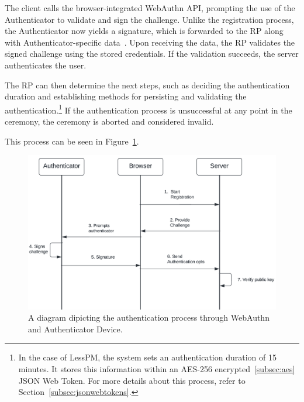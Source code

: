The client calls the browser-integrated WebAuthn API, prompting the use of the
Authenticator to validate and sign the challenge.
Unlike the registration process, the Authenticator now yields a signature, which is forwarded to the RP along with
Authenticator-specific data~\cite{webauthn_authenticator_data}.
Upon receiving the data, the RP validates the signed challenge using the stored credentials.
If the validation succeeds, the server authenticates the user.

The RP can then determine the next steps, such as deciding the authentication
duration and establishing methods for persisting and validating the
authentication.\footnote{
  In the case of LessPM, the system sets an authentication duration of 15 minutes.
  It stores this information within an AES-256 encrypted~\ref{subsec:aes} JSON
  Web Token.
  For more details about this process, refer to Section~\ref{subsec:jsonwebtokens}.
} If the authentication process is unsuccessful at any point in the ceremony,
the ceremony is aborted and considered invalid.

This process can be seen in Figure~\ref{fig:authentication}.

\begin{figure}[htbp]
  \centering
  \includegraphics[width=0.75\linewidth]{images/Authentication}
  \caption{\footnotesize A diagram dipicting the authentication process through WebAuthn and Authenticator Device.}
  \label{fig:authentication}
\end{figure}